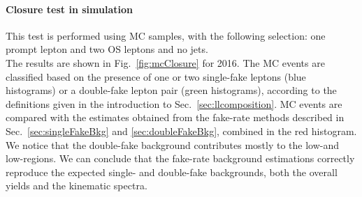 \paragraph{Closure test in simulation}
This test is performed using \ttbar MC samples, with the
following selection: one prompt lepton and two OS \displ leptons and no \PQb jets.\\
The results are shown in Fig.~\ref{fig:mcClosure} for 2016. The MC
events are 
classified based on the presence of one or two single-fake leptons
(blue histograms) or a double-fake lepton pair (green histograms),
according to the definitions given in the introduction to
Sec.~\ref{sec:llcomposition}. MC events are compared with the estimates
obtained from the fake-rate methods described in
Sec.~\ref{sec:singleFakeBkg}
and \ref{sec:doubleFakeBkg}, combined in the red histogram.
We notice that the double-fake background contributes mostly to
the low-\DRtwol and low-\mtwol regions. We can conclude that the
fake-rate background estimations correctly reproduce the expected
single- and double-fake backgrounds, both the overall yields and the
kinematic spectra.
